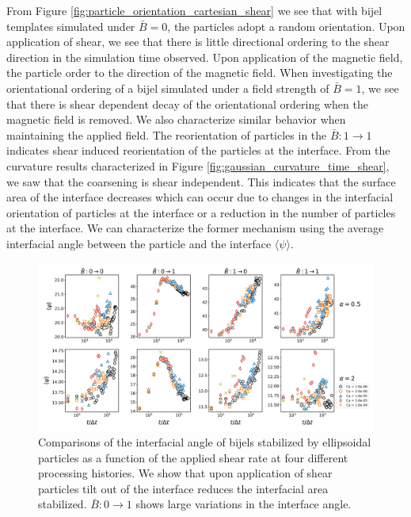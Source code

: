 From Figure \ref{fig:particle_orientation_cartesian_shear} we see that with bijel templates simulated under $\bar{B} = 0$, the
particles adopt a random orientation. Upon application of shear, we see that there is little directional ordering to the 
shear direction in the simulation time observed. Upon application of the magnetic field, the particle order to the direction of the magnetic field. 
When investigating the orientational ordering of a bijel simulated under a field strength of $\bar{B} = 1$, we see that there is
shear dependent decay of the orientational ordering when the magnetic field is removed. We also characterize similar behavior
when maintaining the applied field. The reorientation of particles in the $\bar{B}:1 \rightarrow 1$ indicates shear induced reorientation of the 
particles at the interface. From the curvature results characterized in Figure \ref{fig:gaussian_curvature_time_shear}, we saw that the coarsening is
shear independent. This indicates that the surface area of the interface decreases which can occur due to changes in the interfacial orientation of 
particles at the interface or a reduction in the number of particles at the interface. We can characterize the former mechanism
using the average interfacial angle between the particle and the interface $\langle \psi \rangle$.

\begin{figure} 
    \centering 
    \includegraphics[scale=0.3]{../figures/results/paper3/psi-time_compare.png} 
    \caption{Comparisons of the interfacial angle of bijels stabilized by ellipsoidal particles as a function of 
             the applied shear rate at four different processing histories. We show that upon application of shear
             particles tilt out of the interface reduces the interfacial area stabilized. $\bar{B}: 0 \to 1$ shows 
             large variations in the interface angle.} 
    \label{fig:interface_angle_shear} 
\end{figure}

